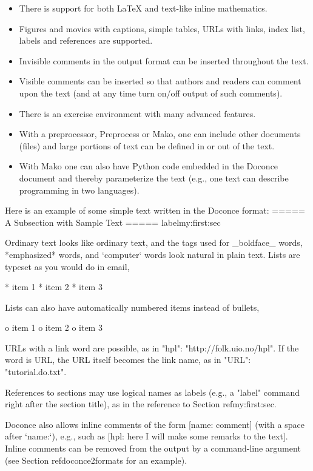 \documentclass[%
oneside,                 %
final,                   %
chapterprefix=true,      %
open=right               %
10pt]{book}
\begin{document}
\begin{itemize}
  \item There is support for both {\LaTeX} and text-like inline mathematics.

  \item Figures and movies with captions, simple tables,
    URLs with links, index list, labels and references are supported.

  \item Invisible comments in the output format can be inserted throughout
    the text.

  \item Visible comments can be inserted so that authors and readers can
    comment upon the text (and at any time turn on/off output of such
    comments).

  \item There is an exercise environment with many advanced features.

  \item With a preprocessor, Preprocess or Mako, one can include
    other documents (files) and large portions of text can be defined
    in or out of the text.

  \item With Mako one can also have Python code
    embedded in the Doconce document and thereby parameterize the
    text (e.g., one text can describe programming in two languages).
\end{itemize}

\noindent
Here is an example of some simple text written in the Doconce format:
\bccq
===== A Subsection with Sample Text =====
label{my:first:sec}

Ordinary text looks like ordinary text, and the tags used for
_boldface_ words, *emphasized* words, and `computer` words look
natural in plain text.  Lists are typeset as you would do in email,

  * item 1
  * item 2
  * item 3

Lists can also have automatically numbered items instead of bullets,

  o item 1
  o item 2
  o item 3

URLs with a link word are possible, as in "hpl": "http://folk.uio.no/hpl".
If the word is URL, the URL itself becomes the link name,
as in "URL": "tutorial.do.txt".

References to sections may use logical names as labels (e.g., a
"label" command right after the section title), as in the reference to
Section ref{my:first:sec}.

Doconce also allows inline comments of the form [name: comment] (with
a space after `name:`), e.g., such as [hpl: here I will make some
remarks to the text]. Inline comments can be removed from the output
by a command-line argument (see Section ref{doconce2formats} for an
example).
\end{document}
